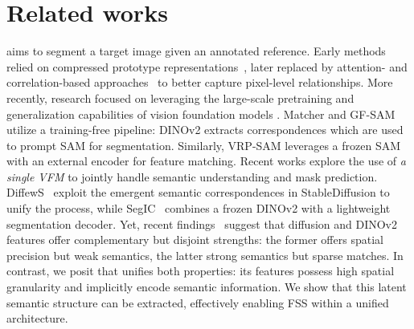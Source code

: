 \vspace{-0.15cm}
\section{Related works}
\vspace{-0.15cm}
 aims to segment a target image given an annotated reference.
Early methods relied on compressed prototype representations~\cite{li2021adaptive, wang2019panet, lang2022learning, liu2022learning, fan2022self}, later replaced by attention- and correlation-based approaches~\cite{wang2020few, zhang2021few, moon2023msi, Min_2021_ICCV, hong2022cost} to better capture pixel-level relationships. More recently, research focused on leveraging the large-scale pretraining and generalization capabilities of vision foundation models \cite{zhu2024unleashing, zhang2023personalize, liu2023matcher, wang2023seggpt, xu2025hybrid}. 
Matcher \cite{liu2023matcher} and GF-SAM \cite{zhang2024bridge} utilize a training-free pipeline: DINOv2 extracts correspondences which are used to prompt SAM for segmentation. Similarly, VRP-SAM \cite{sun2024vrp} leverages a frozen SAM with an external encoder for feature matching. 
Recent works \cite{zhang2023personalize, zhu2024unleashing, meng2024segic} explore the use of \textit{a single VFM} \cite{bommasani2021opportunities} to jointly handle semantic understanding and mask prediction. DiffewS~\cite{zhu2024unleashing} exploit the emergent semantic correspondences in StableDiffusion \cite{rombach2022diffusion} to unify the process, while SegIC~\cite{meng2024segic} combines a frozen DINOv2 with a lightweight segmentation decoder. Yet, recent findings~\cite{zhang2023tale, zhang2024telling} suggest that diffusion and DINOv2 features offer complementary but disjoint strengths: the former offers spatial precision but weak semantics, the latter strong semantics but sparse matches. In contrast, we posit that \sam{} unifies both properties: its features possess high spatial granularity and implicitly encode semantic information. We show that this latent semantic structure can be extracted, effectively enabling FSS within a unified architecture.


